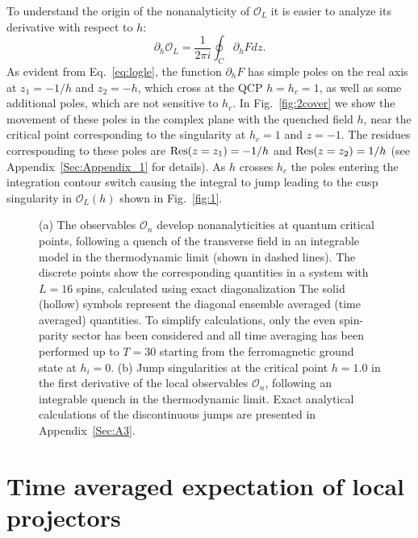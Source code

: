 \documentclass[aps,prx,twocolumn]{revtex4-2}
\begin{document}
 {To understand the origin of the nonanalyticity of $\mathcal O_L$ it is easier to analyze its derivative with respect to $h$:
\begin{equation}\label{eq:der}
\partial_h\mathcal{O}_L=\frac{1}{2\pi i}\oint_{C}\partial_hFdz.
\end{equation}
As evident from Eq.~\eqref{eq:logle}, the function $\partial_h F$ has simple poles on the real axis at $z_1=-1/h$ and $z_2=-h$, which cross at the QCP $h=h_c=1$,  as well as some additional poles,  which are not sensitive to $h_c$.  {In  Fig.~\ref{fig:2cover} we show the movement of these poles in the complex plane with the quenched field $h$, near the critical point corresponding to the singularity at $h_c=1$ and $z=-1$. The residues corresponding to these poles are ${\rm Res}(z=z_1)=-1/h$ and ${\rm Res}(z=z_2)=1/h$ (see Appendix~\ref{Sec:Appendix_1} for details). }As $h$ crosses $h_c$ the poles entering the integration contour switch causing the integral to jump leading to the cusp singularity in $\mathcal O_L(h)$ shown in Fig.~\ref{fig:1}.
}


\begin{figure*}
	\hspace{1.0cm}
	
	\caption{(a) The observables $\mathcal{O}_n$ develop nonanalyticities at quantum critical points, following a quench of the transverse field in an integrable model in the thermodynamic limit (shown in dashed lines). The discrete points show the corresponding quantities in a system with $L=16$ spins, calculated using exact diagonalization The solid (hollow) symbols represent the diagonal ensemble averaged (time averaged) quantities. To simplify calculations, only the even spin-parity sector has been considered and all time averaging has been performed up to $T=30$ starting from the ferromagnetic ground state at $h_i=0$. (b) Jump singularities at the critical point $h=1.0$ in the first derivative of the local observables $\mathcal{O}_n$, following an integrable quench in the thermodynamic limit. Exact analytical calculations of the discontinuous jumps  {are} presented in Appendix~\ref{Sec:A3}.}
\end{figure*}


\section{Time averaged expectation of local projectors}
\label{sec: local_lo}
\end{document}
